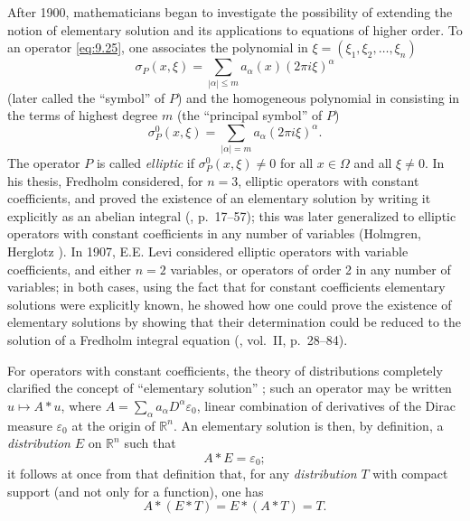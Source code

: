 \documentclass[12pt,a4paper,leqno,twoside]{extbook}
\newcommand{\R}{\mathbb{R}}
\begin{document}
After 1900, mathematicians began to investigate the possibility of extending the notion of elementary solution and its applications to equations of higher order. To an operator \eqref{eq:9.25}, one associates the polynomial in \(\xi = (\xi_1, \xi_2, \ldots, \xi_n)\)
\begin{equation}
    \label{eq:9.28}
    \sigma_P(x,\xi) = \sum_{|\alpha| \leq m} a_\alpha(x)(2\pi i\xi)^\alpha
\end{equation}
(later called the ``symbol'' of \(P\)) and the homogeneous polynomial in  consisting in the terms of highest degree \(m\) (the ``principal symbol'' of \(P\))
\begin{equation}
    \label{eq:9.29}
    \sigma^0_P(x,\xi) = \sum_{|\alpha| = m} a_\alpha(2\pi i\xi)^\alpha.
\end{equation}
The operator \(P\) is called \emph{elliptic} if \(\sigma^0_P(x,\xi) \neq 0\) for all \(x \in \Omega\) and all \(\xi \neq 0\). In his thesis, Fredholm considered, for \(n = 3\), elliptic operators with constant coefficients, and proved the existence of an elementary solution by writing it explicitly as an abelian integral (\cite{074}, p.~17--57); this was later generalized to elliptic operators with constant coefficients in any number of variables (Holmgren, Herglotz \cite{109}). In 1907, E.E. Levi considered elliptic operators with variable coefficients, and either \(n = 2\) variables, or operators of order 2 in any number of variables; in both cases, using the fact that for constant coefficients elementary solutions were explicitly known, he showed how one could prove the existence of elementary solutions by showing that their determination could be reduced to the solution of a Fredholm integral equation (\cite{145}, vol.~II, p.~28--84).

For operators with constant coefficients, the theory of distributions completely clarified the concept of ``elementary solution'' \cite{194}; such an operator may be written \(u \mapsto A * u\), where \(A = \sum\limits_\alpha a_\alpha D^\alpha \varepsilon_0\), linear combination of derivatives of the Dirac measure \(\varepsilon_0\) at the origin of \(\R^n\). An elementary solution is then, by definition, a \emph{distribution} \(E\) on \(\R^n\) such that
\begin{equation}
    \label{eq:9.30}
    A * E = \varepsilon_0;
\end{equation}
it follows at once from that definition that, for any \emph{distribution} \(T\) with compact support (and not only for a function), one has
\begin{equation}
    \label{eq:9.31}
    A*(E*T) = E*(A*T) = T.
\end{equation}
\end{document}
